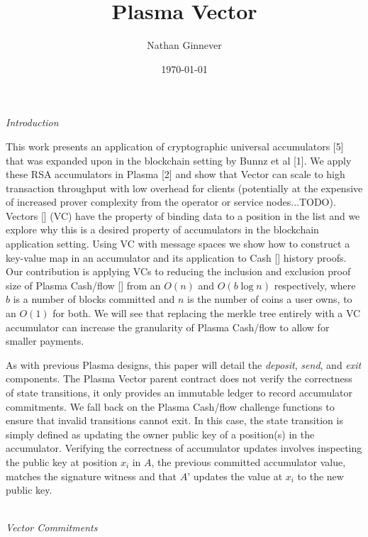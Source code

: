 \documentclass[11pt]{article}
\title{Plasma Vector}
\author{Nathan Ginnever}
\date{\today}
\begin{document}
\maketitle
\centerline{\textit{Introduction}}

This work presents an application of cryptographic universal accumulators [5] that was expanded upon in the blockchain setting by Bunnz et al [1]. We apply these RSA accumulators in Plasma [2] and show that Vector can scale to high transaction throughput with low overhead for clients (potentially at the expensive of increased prover complexity from the operator or service nodes...TODO). Vectors [] (VC) have the property of binding data to a position in the list and we explore why this is a desired property of accumulators in the blockchain application setting. Using VC with message spaces we show how to construct a key-value map in an accumulator and its application to Cash [] history proofs. Our contribution is applying VCs to reducing the inclusion and exclusion proof size of Plasma Cash/flow [] from an $O(n)$ and $O(b \log n)$ respectively, where $b$ is a number of blocks committed and $n$ is the number of coins a user owns, to an $O(1)$ for both. We will see that replacing the merkle tree entirely with a VC accumulator can increase the granularity of Plasma Cash/flow to allow for smaller payments.

As with previous Plasma designs, this paper will detail the \textit{deposit}, \textit{send}, and \textit{exit} components. The Plasma Vector parent contract does not verify the correctness of state transitions, it only provides an immutable ledger to record accumulator commitments. We fall back on the Plasma Cash/flow challenge functions to ensure that invalid transitions cannot exit. In this case, the state transition is simply defined as updating the owner public key of a position(s) in the accumulator. Verifying the correctness of accumulator updates involves inspecting the public key at position $x_i$ in $A$, the previous committed accumulator value, matches the signature witness and that $A’$ updates the value at $x_i$ to the new public key. 
\\
\\

\centerline{\textit{Vector Commitments}}
\end{document}
